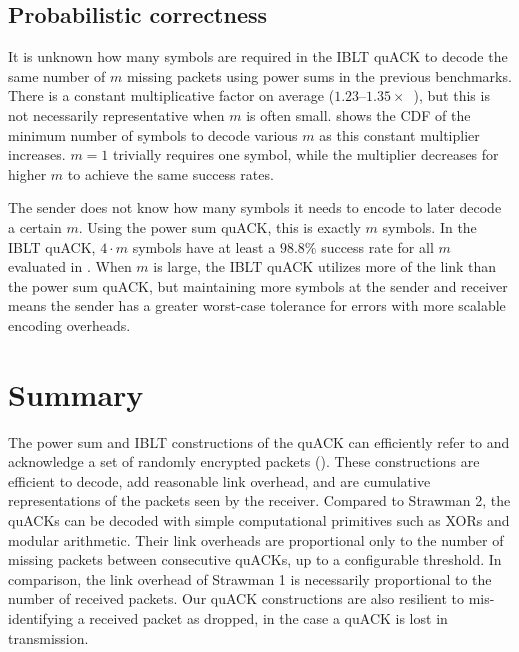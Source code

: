 \subsection{Probabilistic correctness}
\label{sec:quack:iblt-microbenchmarks:correctness}



It is unknown how many symbols are required in the IBLT quACK to decode the same
number of $m$ missing packets using power sums in the previous benchmarks.
There is a constant multiplicative factor on average
($1.23$--$1.35\times$~\cite{yang2024practical,baek2023simple}), but this is
not necessarily representative when $m$ is often small.
 shows the CDF of the minimum number of symbols
to decode various $m$ as this constant multiplier increases. $m=1$ trivially
requires one symbol, while the multiplier decreases for higher $m$ to achieve
the same success rates.

The sender does not know how many symbols it needs to encode to later decode a
certain $m$. Using the power sum quACK, this is exactly $m$ symbols. In the
IBLT quACK, $4 \cdot m$ symbols have at least a $\!98.8\%$ success rate for all
$m$ evaluated in . When $m$ is large, the IBLT
quACK utilizes more of the link than the power sum quACK, but maintaining more
symbols at the sender and receiver means the sender has a greater worst-case
tolerance for errors with more scalable encoding overheads.

\section{Summary}
\label{sec:quack:summary}



The power sum and IBLT constructions of the quACK can efficiently refer to and
acknowledge a set of randomly encrypted packets
(). These constructions are efficient to
decode, add reasonable link overhead, and are cumulative representations of the
packets seen by the receiver. Compared to Strawman 2, the quACKs can be decoded
with simple computational primitives such as XORs and modular arithmetic. Their
link overheads are proportional only to the number of missing packets between
consecutive quACKs, up to a configurable threshold. In comparison, the link
overhead of Strawman 1 is necessarily proportional to the number of received
packets. Our quACK constructions are also resilient to mis-identifying a
received packet as dropped, in the case a quACK is lost in transmission.

